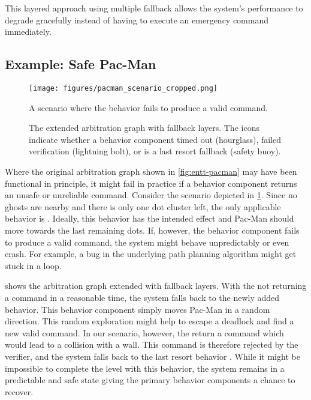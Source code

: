 This layered approach using multiple fallback allows the system's performance to degrade gracefully instead of having to execute an emergency command immediately.

\subsection{Example: Safe Pac-Man}

\begin{figure}
    \centering
    \texttt{[image: figures/pacman\_scenario\_cropped.png]}
    \caption{A scenario where the  behavior fails to produce a valid command.}
    \label{fig:pacman-scenario}
\end{figure}

\begin{figure}
    \centering
    
    \caption{The extended arbitration graph with fallback layers. The icons indicate whether a behavior component
        timed out (hourglass),
        failed verification (lightning bolt),
        or is a last resort fallback (safety buoy).}
    \label{fig:pacman-arbitrator-safe}
\end{figure}

Where the original arbitration graph shown in \cref{fig:entt-pacman} may have been functional in principle, it might fail in practice if a behavior component returns an unsafe or unreliable command.
Consider the scenario depicted in \cref{fig:pacman-scenario}.
Since no ghosts are nearby and there is only one dot cluster left, the only applicable behavior is .
Ideally, this behavior has the intended effect and Pac-Man should move towards the last remaining dots.
If, however, the behavior component fails to produce a valid command, the system might behave unpredictably or even crash.
For example, a bug in the underlying path planning algorithm might get stuck in a loop.

 shows the arbitration graph extended with fallback layers.
With the  not returning a command in a reasonable time, the system falls back to the newly added  behavior.
This behavior component simply moves Pac-Man in a random direction.
This random exploration might help to escape a deadlock and find a new valid command.
In our scenario, however, the  return a command which would lead to a collision with a wall.
This command is therefore rejected by the verifier, and the system falls back to the last resort behavior .
While it might be impossible to complete the level with this behavior, the system remains in a predictable and safe state giving the primary behavior components a chance to recover.

